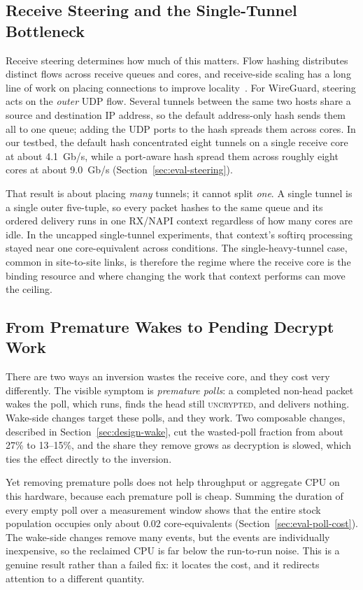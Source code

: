 \subsection{Receive Steering and the Single-Tunnel Bottleneck}
\label{sec:background-steering}

Receive steering determines how much of this matters. Flow hashing distributes
distinct flows across receive queues and cores, and receive-side scaling has a
long line of work on placing connections to improve
locality~\cite{linux-napi,pesterev2012affinity}. For WireGuard, steering acts on
the \emph{outer} UDP flow. Several tunnels between the same two hosts share a
source and destination IP address, so the default address-only hash sends them
all to one queue; adding the UDP ports to the hash spreads them across cores. In
our testbed, the default hash concentrated eight tunnels on a single receive
core at about 4.1~Gb/s, while a port-aware hash spread them across roughly eight
cores at about 9.0~Gb/s (Section~\ref{sec:eval-steering}).

That result is about placing \emph{many} tunnels; it cannot split \emph{one}. A
single tunnel is a single outer five-tuple, so every packet hashes to the same
queue and its ordered delivery runs in one RX/NAPI context regardless of how
many cores are idle. In the uncapped single-tunnel experiments, that context's
softirq processing stayed near one core-equivalent across conditions. The
single-heavy-tunnel case, common in site-to-site links, is therefore the regime
where the receive core is the binding resource and where changing the work that
context performs can move the ceiling.

\subsection{From Premature Wakes to Pending Decrypt Work}
\label{sec:background-wake}

There are two ways an inversion wastes the receive core, and they cost very
differently. The visible symptom is \emph{premature polls}: a completed non-head
packet wakes the poll, which runs, finds the head still \textsc{uncrypted}, and
delivers nothing. Wake-side changes target these polls, and they work. Two
composable changes, described in Section~\ref{sec:design-wake}, cut the
wasted-poll fraction from about 27\% to 13--15\%, and the share they remove
grows as decryption is slowed, which ties the effect directly to the inversion.

Yet removing premature polls does not help throughput or aggregate CPU on this
hardware, because each premature poll is cheap. Summing the duration of every
empty poll over a measurement window shows that the entire stock population
occupies only about $0.02$ core-equivalents
(Section~\ref{sec:eval-poll-cost}). The wake-side changes remove many events,
but the events are individually inexpensive, so the reclaimed CPU is far below
the run-to-run noise. This is a genuine result rather than a failed fix: it
locates the cost, and it redirects attention to a different quantity.

